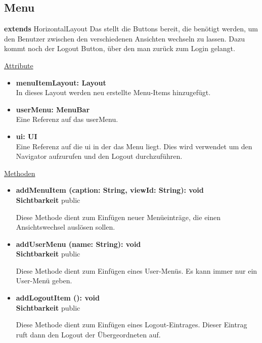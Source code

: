 \newpage
\subsection{Menu}\label{Menu}
\textbf{extends}  HorizontalLayout \newline
Das  stellt die Buttons bereit, die benötigt werden, um den Benutzer zwischen den verschiedenen Ansichten wechseln zu lassen. Dazu kommt noch der Logout Button, über den man zurück zum Login gelangt.
\newline

\underline{Attribute}
\begin{itemize}
\itemsep0pt

\item \textbf{menuItemLayout: Layout} \hfill\\ 
In dieses Layout werden neu erstellte Menu-Items hinzugefügt.

\item \textbf{userMenu: MenuBar} \hfill\\ 
Eine Referenz auf das userMenu.

\item \textbf{ui: UI} \hfill\\ 
Eine Referenz auf die ui in der das Menu liegt. Dies wird verwendet um den Navigator aufzurufen und den Logout durchzuführen.

\end{itemize}

\underline{Methoden}
\begin{itemize}
\itemsep0pt
\item \textbf{addMenuItem (caption: String, viewId: String): void}\hfill\\
\textbf{Sichtbarkeit} public

Diese Methode dient zum Einfügen neuer Menüeinträge, die einen Ansichtswechsel auslösen sollen.

\item \textbf{addUserMenu (name: String): void}\hfill\\
\textbf{Sichtbarkeit} public

Diese Methode dient zum Einfügen eines User-Menüs. Es kann immer nur ein User-Menü geben.

\item \textbf{addLogoutItem (): void}\hfill\\
\textbf{Sichtbarkeit} public

Diese Methode dient zum Einfügen eines Logout-Eintrages. Dieser Eintrag ruft dann den Logout der Übergeordneten  auf.

\end{itemize}
